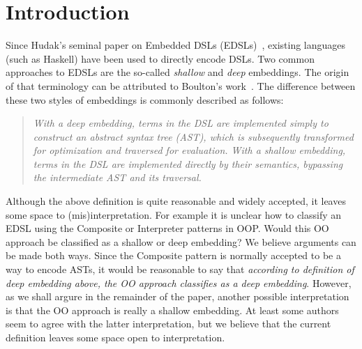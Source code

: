 \section{Introduction}

Since Hudak's seminal paper on Embedded DSLs (EDSLs)~\cite{}, existing
languages (such as Haskell) have been used to directly encode
DSLs. Two common approaches to EDSLs are the so-called \emph{shallow}
and \emph{deep} embeddings. The origin of that terminology can be
attributed to Boulton's work~\cite{}. The difference between these
two styles of embeddings is commonly described as follows:

\begin{quote}
\emph{With a deep embedding, terms in the DSL are implemented simply to
construct an abstract syntax tree (AST), which is subsequently
transformed for optimization and traversed for evaluation. With a
shallow embedding, terms in the DSL are implemented directly by
their semantics, bypassing the intermediate AST and its traversal.}\cite{gibbons15folding}
\end{quote}


Although the above definition is quite reasonable and widely accepted,
it leaves some space to (mis)interpretation. For example it is unclear 
how to classify an EDSL using the {\sc Composite} or {\sc Interpreter} 
patterns in OOP. Would this OO approach be
classified as a shallow or deep embedding? We believe arguments can be
made both ways. Since the {\sc Composite}
pattern is normally accepted to be a way to encode ASTs, it would be
reasonable to say that \emph{according to definition of deep embedding
  above, the OO approach classifies as a deep
  embedding}. However, as we shall argure in the remainder of the
paper, another possible interpretation is that the OO approach is
really a shallow embedding. At least some authors~\cite{} seem to agree with 
the latter interpretation, but we believe that the current definition
leaves some space open to interpretation.

